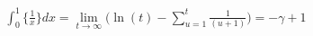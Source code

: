 \documentclass[preview]{standalone}
\begin{document}
\begin{align*}
\int_{0}^{1}\bigg\{\frac{1}{x}\bigg\}dx = \lim_{t\to\infty} \bigg(\ln(t)-\sum_{u=1}^{t}\frac{1}{(u+1)}\bigg)= -\gamma+1
\end{align*}
\end{document}
